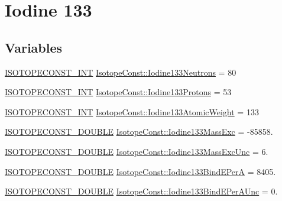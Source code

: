 \hypertarget{group___isotope_const-_iodine-_i133}{}\section{Iodine 133}
\label{group___isotope_const-_iodine-_i133}
\subsection*{Variables}
\begin{DoxyCompactItemize}
\item 
\mbox{\hyperlink{group___isotope_const-_macros_ga5f18360b3e99483a35c32d789e62621c}{I\+S\+O\+T\+O\+P\+E\+C\+O\+N\+S\+T\+\_\+\+I\+NT}} \mbox{\hyperlink{group___isotope_const-_iodine-_i133_ga1034ce0f098ccaec6f2ca2071678845d}{Isotope\+Const\+::\+Iodine133\+Neutrons}} = 80
\item 
\mbox{\hyperlink{group___isotope_const-_macros_ga5f18360b3e99483a35c32d789e62621c}{I\+S\+O\+T\+O\+P\+E\+C\+O\+N\+S\+T\+\_\+\+I\+NT}} \mbox{\hyperlink{group___isotope_const-_iodine-_i133_gafa7657b80043009202f85c9344c05a13}{Isotope\+Const\+::\+Iodine133\+Protons}} = 53
\item 
\mbox{\hyperlink{group___isotope_const-_macros_ga5f18360b3e99483a35c32d789e62621c}{I\+S\+O\+T\+O\+P\+E\+C\+O\+N\+S\+T\+\_\+\+I\+NT}} \mbox{\hyperlink{group___isotope_const-_iodine-_i133_gade2963eb58691c7fdb0c79547a8b6e4c}{Isotope\+Const\+::\+Iodine133\+Atomic\+Weight}} = 133
\item 
\mbox{\hyperlink{group___isotope_const-_macros_ga8f45a7272ce02c0b4c65c44636ed719a}{I\+S\+O\+T\+O\+P\+E\+C\+O\+N\+S\+T\+\_\+\+D\+O\+U\+B\+LE}} \mbox{\hyperlink{group___isotope_const-_iodine-_i133_ga0c9a6970706589a3161eb71ffa1d6a9d}{Isotope\+Const\+::\+Iodine133\+Mass\+Exc}} = -\/85858.
\item 
\mbox{\hyperlink{group___isotope_const-_macros_ga8f45a7272ce02c0b4c65c44636ed719a}{I\+S\+O\+T\+O\+P\+E\+C\+O\+N\+S\+T\+\_\+\+D\+O\+U\+B\+LE}} \mbox{\hyperlink{group___isotope_const-_iodine-_i133_gacd2341cccc36c279494010fb2303a46e}{Isotope\+Const\+::\+Iodine133\+Mass\+Exc\+Unc}} = 6.
\item 
\mbox{\hyperlink{group___isotope_const-_macros_ga8f45a7272ce02c0b4c65c44636ed719a}{I\+S\+O\+T\+O\+P\+E\+C\+O\+N\+S\+T\+\_\+\+D\+O\+U\+B\+LE}} \mbox{\hyperlink{group___isotope_const-_iodine-_i133_ga3d4fa4a531f7b4109b1327d3c3f41556}{Isotope\+Const\+::\+Iodine133\+Bind\+E\+PerA}} = 8405.
\item 
\mbox{\hyperlink{group___isotope_const-_macros_ga8f45a7272ce02c0b4c65c44636ed719a}{I\+S\+O\+T\+O\+P\+E\+C\+O\+N\+S\+T\+\_\+\+D\+O\+U\+B\+LE}} \mbox{\hyperlink{group___isotope_const-_iodine-_i133_ga2bd1c4f808f311861938d73ec4cc2569}{Isotope\+Const\+::\+Iodine133\+Bind\+E\+Per\+A\+Unc}} = 0.

\end{DoxyCompactItemize}
